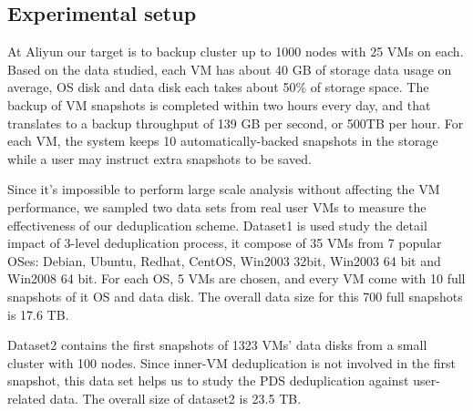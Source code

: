 \subsection{Experimental setup}

At Aliyun our target is to backup cluster up to 1000 nodes
with 25 VMs on each.
Based on the data studied,  each VM has about  40 GB of storage  data usage on average,
OS disk and data disk each takes about 50\% of storage space.
The backup of VM snapshots is completed within two hours every day,
and that translates to a backup throughput of 139 GB per second, or 500TB per hour.
For each VM, the system keeps 10 automatically-backed snapshots in the storage while
a user may instruct extra snapshots to be saved.



Since it's impossible to perform large scale analysis without affecting the VM performance,
we sampled two data sets from real user VMs to measure the effectiveness of our deduplication scheme.
Dataset1 is used study the detail impact of 3-level deduplication process,
it compose of 35 VMs from 7 popular OSes:
Debian, Ubuntu, Redhat, CentOS, Win2003 32bit, Win2003 64 bit and Win2008 64 bit. For each OS,
5 VMs are chosen, and every VM come with 10 full snapshots of it OS and data disk.
The overall data size for this 700 full snapshots is 17.6 TB.

Dataset2 contains the first snapshots of 1323 VMs' data disks from a small cluster with 100 nodes.
Since inner-VM deduplication is not involved in the first snapshot, this data set helps us to
study the PDS deduplication against user-related data. The overall size of dataset2 is 23.5 TB.

